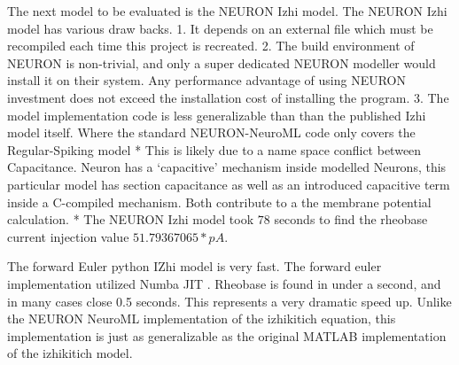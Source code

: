The next model to be evaluated is the NEURON Izhi model. The NEURON Izhi model has various draw backs. 1. It depends on an external file which must be recompiled each time this project is recreated. 2. The build environment of NEURON is non-trivial, and only a super dedicated NEURON modeller would install it on their system. Any performance advantage of using NEURON investment does not exceed the installation cost of installing the program. 3. The model implementation code is less generalizable than than the published Izhi model itself. Where the standard NEURON-NeuroML code only covers the Regular-Spiking model * This is likely due to a name space conflict between Capacitance. Neuron has a `capacitive' mechanism inside modelled Neurons, this particular model has section capacitance as well as an introduced capacitive term inside a C-compiled mechanism. Both contribute to a the membrane
potential calculation. * The NEURON Izhi model took $78$ seconds to find the rheobase current injection value $ 51.79367065 * pA $.

    



        
The forward Euler python IZhi model is very fast. The forward euler
implementation utilized Numba JIT \cite{lam2015numba}. Rheobase is found in under a second,
and in many cases close 0.5 seconds. This represents a very dramatic
speed up. Unlike the NEURON NeuroML implementation of the izhikitich equation,
this implementation is just as generalizable as the original MATLAB
implementation of the izhikitich model.

        
